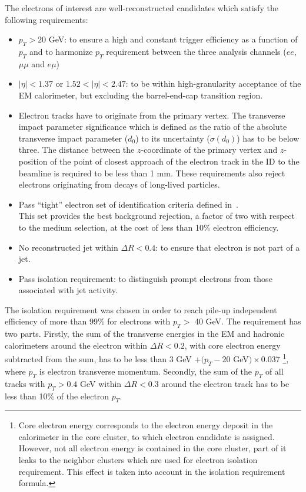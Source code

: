 The electrons of interest are well-reconstructed candidates which satisfy
the following requirements:
\begin{itemize}
 \item $p_T > 20$ GeV: to ensure a high and constant trigger efficiency as a function of $p_T$ and to harmonize $p_T$ requirement between the three analysis channels ($ee$, $\mu\mu$ and $e\mu$) 
 \item $|\eta|<1.37$ or $1.52<|\eta|<2.47$: to be within high-granularity acceptance of the EM calorimeter, but excluding the barrel-end-cap transition region.
 \item Electron tracks have to originate from the primary vertex.
 The transverse impact parameter significance which is defined as the ratio of the absolute transverse impact parameter ($d_0$) to its uncertainty ($\sigma(d_0)$) has to be below three. The distance between the $z$-coordinate of the primary vertex and $z$-position of the point of closest approach of the electron track in the ID to the beamline is required to be less than 1 mm.
 These requirements also reject electrons originating from decays of long-lived particles.
 \item Pass ``tight'' electron set of identification criteria defined in~\cite{electron_tight}. \\ 
 This set provides the best background rejection, a factor of two with respect to the medium selection, 
 at the cost of less than 10$\%$ electron efficiency.
 \item No reconstructed jet within $\Delta R < 0.4$: 
 to ensure that electron is not part of a jet.
 \item Pass isolation requirement: to distinguish prompt electrons from those associated with jet activity.
\end{itemize}

The isolation requirement was chosen in order to reach pile-up independent efficiency of more than 99$\%$ for electrons 
with $p_T >$ 40 GeV. The requirement has two parts.
Firstly, the sum of the transverse energies in the EM and hadronic calorimeters around the electron within 
$\Delta R < 0.2$, with core electron energy subtracted from the sum, has to be less than 
3 GeV $+ (p_T - 20$ GeV$) \times 0.037$
\footnote{
Core electron energy corresponds to the electron energy deposit in the calorimeter in the core cluster, to which electron candidate is assigned. However, not all electron energy is contained in the core cluster, part of it leaks to the neighbor clusters which are used for electron isolation requirement. This effect is taken into account in the isolation requirement formula.}, 
where $p_T$ is electron transverse momentum.
Secondly, the sum of the $p_T$ of all tracks with $p_T > 0.4$ GeV within $\Delta R < 0.3$ around the electron track has
to be less than 10$\%$ of the electron $p_T$.

